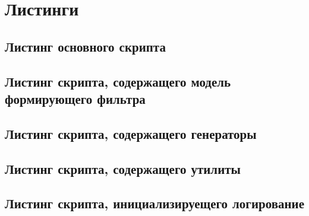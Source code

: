 \clearpage

\section*{Листинги}

\subsection*{Листинг основного скрипта}


\subsection*{Листинг скрипта, содержащего модель формирующего фильтра}


\subsection*{Листинг скрипта, содержащего генераторы}


\subsection*{Листинг скрипта, содержащего утилиты}


\subsection*{Листинг скрипта, инициализируещего логирование}

